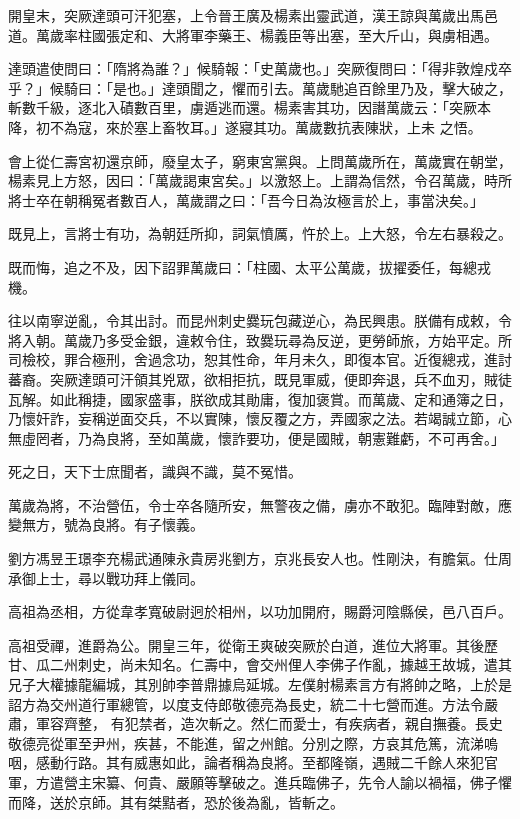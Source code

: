 \begin{pinyinscope}
 開皇末，突厥達頭可汗犯塞，上令晉王廣及楊素出靈武道，漢王諒與萬歲出馬邑道。萬歲率柱國張定和、大將軍李藥王、楊義臣等出塞，至大斤山，與虜相遇。



 達頭遣使問曰：「隋將為誰？」候騎報：「史萬歲也。」突厥復問曰：「得非敦煌戍卒乎？」候騎曰：「是也。」達頭聞之，懼而引去。萬歲馳追百餘里乃及，擊大破之，斬數千級，逐北入磧數百里，虜遁逃而還。楊素害其功，因譖萬歲云：「突厥本降，初不為寇，來於塞上畜牧耳。」遂寢其功。萬歲數抗表陳狀，上未
 之悟。



 會上從仁壽宮初還京師，廢皇太子，窮東宮黨與。上問萬歲所在，萬歲實在朝堂，楊素見上方怒，因曰：「萬歲謁東宮矣。」以激怒上。上謂為信然，令召萬歲，時所將士卒在朝稱冤者數百人，萬歲謂之曰：「吾今日為汝極言於上，事當決矣。」



 既見上，言將士有功，為朝廷所抑，詞氣憤厲，忤於上。上大怒，令左右暴殺之。



 既而悔，追之不及，因下詔罪萬歲曰：「柱國、太平公萬歲，拔擢委任，每總戎機。



 往以南寧逆亂，令其出討。而昆州刺史爨玩包藏逆心，為民興患。朕備有成敕，令將入朝。萬歲乃多受金銀，違敕令住，致爨玩尋為反逆，更勞師旅，方始平定。所
 司檢校，罪合極刑，舍過念功，恕其性命，年月未久，即復本官。近復總戎，進討蕃裔。突厥達頭可汗領其兇眾，欲相拒抗，既見軍威，便即奔退，兵不血刃，賊徒瓦解。如此稱捷，國家盛事，朕欲成其勛庸，復加褒賞。而萬歲、定和通簿之日，乃懷奸詐，妄稱逆面交兵，不以實陳，懷反覆之方，弄國家之法。若竭誠立節，心無虛罔者，乃為良將，至如萬歲，懷詐要功，便是國賊，朝憲難虧，不可再舍。」



 死之日，天下士庶聞者，識與不識，莫不冤惜。



 萬歲為將，不治營伍，令士卒各隨所安，無警夜之備，虜亦不敢犯。臨陣對敵，應變無方，號為良將。有子懷義。



 劉方馮昱王璟李充楊武通陳永貴房兆劉方，京兆長安人也。性剛決，有膽氣。仕周承御上士，尋以戰功拜上儀同。



 高祖為丞相，方從韋孝寬破尉迥於相州，以功加開府，賜爵河陰縣侯，邑八百戶。



 高祖受禪，進爵為公。開皇三年，從衛王爽破突厥於白道，進位大將軍。其後歷甘、瓜二州刺史，尚未知名。仁壽中，會交州俚人李佛子作亂，據越王故城，遣其兄子大權據龍編城，其別帥李普鼎據烏延城。左僕射楊素言方有將帥之略，上於是詔方為交州道行軍總管，以度支侍郎敬德亮為長史，統二十七營而進。方法令嚴肅，軍容齊整，
 有犯禁者，造次斬之。然仁而愛士，有疾病者，親自撫養。長史敬德亮從軍至尹州，疾甚，不能進，留之州館。分別之際，方哀其危篤，流涕嗚咽，感動行路。其有威惠如此，論者稱為良將。至都隆嶺，遇賊二千餘人來犯官軍，方遣營主宋纂、何貴、嚴願等擊破之。進兵臨佛子，先令人諭以禍福，佛子懼而降，送於京師。其有桀黠者，恐於後為亂，皆斬之。




\end{pinyinscope}
